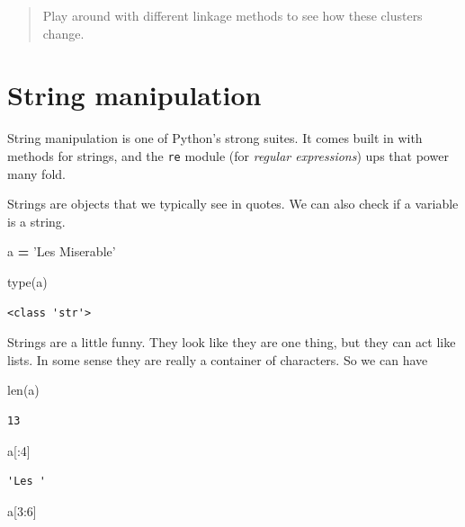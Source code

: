 \documentclass[
  letterpaper,
]{scrbook}
\newenvironment{Shaded}{\begin{snugshade}}{\end{snugshade}}
\newcommand{\BuiltInTok}[1]{#1}
\newcommand{\DecValTok}[1]{\textcolor[rgb]{0.00,0.00,0.81}{#1}}
\newcommand{\NormalTok}[1]{#1}
\newcommand{\OperatorTok}[1]{\textcolor[rgb]{0.81,0.36,0.00}{\textbf{#1}}}
\newcommand{\StringTok}[1]{\textcolor[rgb]{0.31,0.60,0.02}{#1}}
\begin{document}
\begin{quote}
Play around with different linkage methods to see how these clusters change.
\end{quote}

\hypertarget{string-manipulation}{%
\chapter{String manipulation}\label{string-manipulation}}

String manipulation is one of Python's strong suites. It comes built in with methods for strings, and the \texttt{re} module (for \emph{regular expressions}) ups that power many fold.

Strings are objects that we typically see in quotes. We can also check if a variable is a string.

\begin{Shaded}
\begin{Highlighting}[]
\NormalTok{a }\OperatorTok{=} \StringTok{'Les Miserable'}

\BuiltInTok{type}\NormalTok{(a)}
\end{Highlighting}
\end{Shaded}

\begin{verbatim}
<class 'str'>
\end{verbatim}

Strings are a little funny. They look like they are one thing, but they can act like lists. In some sense they
are really a container of characters. So we can have

\begin{Shaded}
\begin{Highlighting}[]
\BuiltInTok{len}\NormalTok{(a)}
\end{Highlighting}
\end{Shaded}

\begin{verbatim}
13
\end{verbatim}

\begin{Shaded}
\begin{Highlighting}[]
\NormalTok{a[:}\DecValTok{4}\NormalTok{]}
\end{Highlighting}
\end{Shaded}

\begin{verbatim}
'Les '
\end{verbatim}

\begin{Shaded}
\begin{Highlighting}[]
\NormalTok{a[}\DecValTok{3}\NormalTok{:}\DecValTok{6}\NormalTok{]}
\end{Highlighting}
\end{Shaded}
\end{document}
